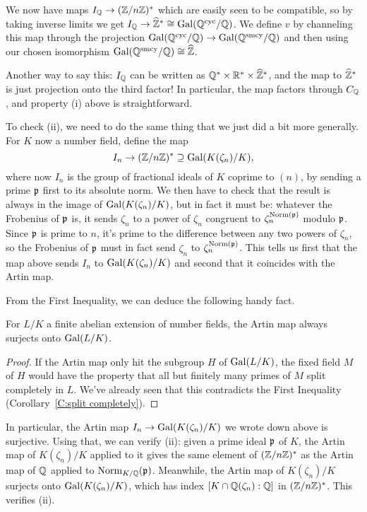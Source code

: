 We now have maps $I_{\mathbb{Q}} \to (\mathbb{Z}/n\mathbb{Z})^*$ which are easily seen to
be compatible, so by taking inverse limits we get $I_{\mathbb{Q}} \to
\widehat{\mathbb{Z}}^* \cong \operatorname{Gal}(\mathbb{Q}^{\operatorname{cyc}}/\mathbb{Q})$. We define $v$ by channeling this
map through the projection $\operatorname{Gal}(\mathbb{Q}^{\operatorname{cyc}}/\mathbb{Q}) \to \operatorname{Gal}(\mathbb{Q}^{\operatorname{smcy}}/\mathbb{Q})$
and then using our chosen isomorphism $\operatorname{Gal}(\mathbb{Q}^{\operatorname{smcy}}/\mathbb{Q}) \cong
\widehat{\mathbb{Z}}$.

Another way to say this:
$I_{\mathbb{Q}}$ can be written as $\mathbb{Q}^* \times \mathbb{R}^* \times
\widehat{\mathbb{Z}}^*$, and the map to $\widehat{\mathbb{Z}}^*$ is just projection
onto the third factor! In particular, the map factors through
$C_{\mathbb{Q}}$, and property (i) above is straightforward.

To check (ii), we need to do the same thing that we just did a bit more
generally. For $K$ now a number field, define the map
\[
I_n \to (\mathbb{Z}/n\mathbb{Z})^* \supseteq \operatorname{Gal}(K(\zeta_n)/K),
\]
where now $I_n$ is the group of fractional ideals of $K$ coprime to $(n)$,
by sending a prime $\mathfrak{p}$ first to its absolute norm. We then have to check
that the result is always in the image of $\operatorname{Gal}(K(\zeta_n)/K)$, but in fact
it must be: whatever the Frobenius of $\mathfrak{p}$ is, it sends $\zeta_n$
to a power of $\zeta_n$ congruent to $\zeta_n^{\operatorname{Norm}(\mathfrak{p})}$
modulo $\mathfrak{p}$. Since $\mathfrak{p}$ is prime to $n$, it's prime to the difference
between any two powers of $\zeta_n$, so the Frobenius of $\mathfrak{p}$ must
in fact send $\zeta_n$ to $\zeta_n^{\operatorname{Norm}(\mathfrak{p})}$. This tells us first
that the map
above sends $I_n$ to $\operatorname{Gal}(K(\zeta_n)/K)$ and second that it coincides
with the Artin map.

From the First Inequality, we can deduce the following handy fact.
\begin{prop}
For $L/K$ a finite abelian extension of number fields, the Artin map
always surjects onto $\operatorname{Gal}(L/K)$.
\end{prop}
\begin{proof}
If the Artin map only hit the subgroup $H$ of $\operatorname{Gal}(L/K)$, the fixed
field $M$ of $H$ would have the property that all but finitely many primes
of $M$ split completely in $L$. We've already seen that this contradicts
the First Inequality (Corollary~\ref{C:split completely}).
\end{proof}
In particular, the Artin map $I_n \to \operatorname{Gal}(K(\zeta_n)/K)$ we wrote down
above is surjective.
Using that, we can verify (ii): given a prime ideal $\mathfrak{p}$ of
$K$, the Artin map of $K(\zeta_n)/K$ applied to it gives the same
element of $(\mathbb{Z}/n\mathbb{Z})^*$ as the Artin map of $\mathbb{Q}$ applied to
$\operatorname{Norm}_{K/\mathbb{Q}}(\mathfrak{p})$. Meanwhile, the Artin map of $K(\zeta_n)/K$
surjects onto $\operatorname{Gal}(K(\zeta_n)/K)$, which has index
$[K \cap \mathbb{Q}(\zeta_n):\mathbb{Q}]$ in $(\mathbb{Z}/n\mathbb{Z})^*$. This verifies (ii).

